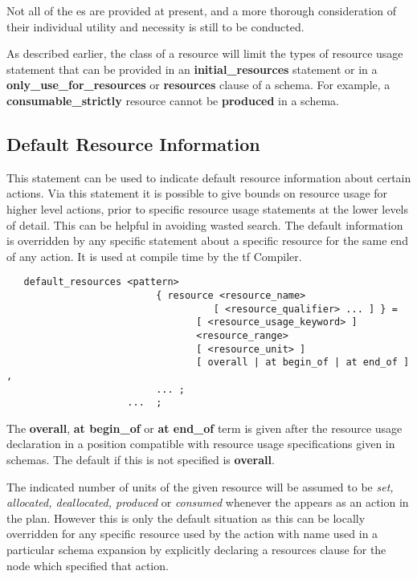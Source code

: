 Not all of the es are provided at present, and a more
thorough consideration of their individual utility and necessity is still to
be conducted.

As described earlier, the class of a resource will limit the types of
resource usage statement that can be provided in an {\bf
initial\_resources} statement or in a {\bf only\_use\_for\_resources} or
{\bf resources} clause of a schema.  For example, a {\bf
consumable\_strictly} resource cannot be {\bf produced} in a schema. 

\subsection{Default Resource Information}
 

This statement can be used to indicate default resource information
about certain actions.  Via this statement it is possible to
give bounds on resource usage for higher level actions, prior to specific
resource usage statements at the lower levels of detail.  This can be helpful
in avoiding wasted search.  The default information
is overridden by any specific statement
about a specific resource for the same end of any action.  It is
used at compile time by the {\sc tf} Compiler.

\begin{verbatim}
   default_resources <pattern>
                          { resource <resource_name>
                                    [ <resource_qualifier> ... ] } =
                                 [ <resource_usage_keyword> ]
                                 <resource_range>
                                 [ <resource_unit> ]
                                 [ overall | at begin_of | at end_of ] ,
                          ... ;
                     ...  ;
\end{verbatim}

The {\bf overall}, {\bf at begin\_of} or {\bf at end\_of} term is given
after the resource usage declaration in a position compatible with
resource usage specifications given in schemas.  The default if this is
not specified is {\bf overall}. 

The indicated number of units of the given resource will be assumed to
be {\em set, allocated, deallocated, produced} or {\em consumed} whenever the
 appears as an action in the plan. However this
is only the default situation as this can be locally overridden for
any specific resource used by the action with name
 used in a particular schema expansion by
explicitly declaring a resources clause for the node which specified that 
action.


